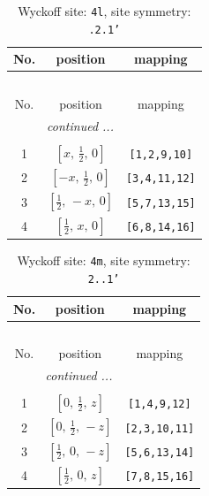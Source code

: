 \documentclass[fleqn,8pt]{jsarticle}
\begin{document}
\renewcommand{\arraystretch}{1.2}
\begin{longtable}{ccc}
\caption{Wyckoff site: {\tt 4l}, site symmetry: {\tt .2.1'}}
 \\
 \hline \hline
No. & position & mapping \\ \hline \endfirsthead

\multicolumn{2}{l}{\tablename\ \thetable{}} \\
 \hline \hline
No. & position & mapping \\ \hline \endhead

 \hline \hline
\multicolumn{2}{r}{\footnotesize\it continued ...} \\ \endfoot

 \hline \hline
\multicolumn{2}{r}{} \\ \endlastfoot

1 & $\left[ x,\, \frac{1}{2},\, 0 \right]$ & {\tt [1,2,9,10]} \\ \hline
2 & $\left[ - x,\, \frac{1}{2},\, 0 \right]$ & {\tt [3,4,11,12]} \\ \hline
3 & $\left[ \frac{1}{2},\, - x,\, 0 \right]$ & {\tt [5,7,13,15]} \\ \hline
4 & $\left[ \frac{1}{2},\, x,\, 0 \right]$ & {\tt [6,8,14,16]} \\
\end{longtable}
\renewcommand{\arraystretch}{1.2}
\begin{longtable}{ccc}
\caption{Wyckoff site: {\tt 4m}, site symmetry: {\tt 2..1'}}
 \\
 \hline \hline
No. & position & mapping \\ \hline \endfirsthead

\multicolumn{2}{l}{\tablename\ \thetable{}} \\
 \hline \hline
No. & position & mapping \\ \hline \endhead

 \hline \hline
\multicolumn{2}{r}{\footnotesize\it continued ...} \\ \endfoot

 \hline \hline
\multicolumn{2}{r}{} \\ \endlastfoot

1 & $\left[ 0,\, \frac{1}{2},\, z \right]$ & {\tt [1,4,9,12]} \\ \hline
2 & $\left[ 0,\, \frac{1}{2},\, - z \right]$ & {\tt [2,3,10,11]} \\ \hline
3 & $\left[ \frac{1}{2},\, 0,\, - z \right]$ & {\tt [5,6,13,14]} \\ \hline
4 & $\left[ \frac{1}{2},\, 0,\, z \right]$ & {\tt [7,8,15,16]} \\
\end{longtable}
\end{document}
